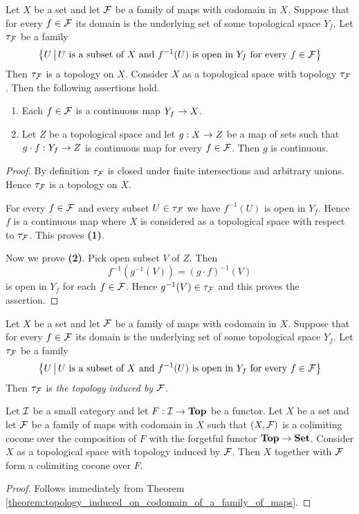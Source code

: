 \begin{theorem}\label{theorem:topology_induced_on_codomain_of_a_family_of_maps}
	Let $X$ be a set and let ${\mathcal F}$ be a family of maps with codomain in $X$. Suppose that for every $f \in {\mathcal F}$ its domain is the underlying set of some topological space $Y_f$. Let $\tau_{{\mathcal F}}$ be a family
	$$\big\{U\,\big|\,U\mbox{ is a subset of }X\mbox{ and }f^{-1}(U)\mbox{ is open in }Y_f\mbox{ for every }f\in {\mathcal F}\big\}$$
	Then $\tau_{{\mathcal F}}$ is a topology on $X$. Consider $X$ as a topological space with topology $\tau_{{\mathcal F}}$. Then the following assertions hold.
	\begin{enumerate}[label=\emph{\textbf{(\arabic*)}}, leftmargin=3.0em]
		\item Each $f \in {\mathcal F}$ is a continuous map $Y_f \rightarrow X$.
		\item Let $Z$ be a topological space and let $g:X\rightarrow Z$ be a map of sets such that $g\cdot f:Y_f\rightarrow Z$ is continuous map for every $f \in {\mathcal F}$. Then $g$ is continuous.
	\end{enumerate}
\end{theorem}
\begin{proof}
	By definition $\tau_{{\mathcal F}}$ is closed under finite intersections and arbitrary unions. Hence $\tau_{{\mathcal F}}$ is a topology on $X$.

	For every $f \in {\mathcal F}$ and every subset $U \in \tau_{{\mathcal F}}$ we have $f^{-1}(U)$ is open in $Y_f$. Hence $f$ is a continuous map where $X$ is considered as a topological space with respect to $\tau_{{\mathcal F}}$. This proves \textbf{(1)}.

	Now we prove \textbf{(2)}. Pick open subset $V$ of $Z$. Then
	$$f^{-1}\left(g^{-1}(V)\right) = \left(g\cdot f\right)^{-1}(V)$$
	is open in $Y_f$ for each $f \in {\mathcal F}$. Hence $g^{-1}(V) \in \tau_{{\mathcal F}}$ and this proves the assertion.
\end{proof}

\begin{definition}
	Let $X$ be a set and let ${\mathcal F}$ be a family of maps with codomain in $X$. Suppose that for every $f \in {\mathcal F}$ its domain is the underlying set of some topological space $Y_f$. Let $\tau_{{\mathcal F}}$ be a family
	$$\big\{U\,\big|\,U\mbox{ is a subset of }X\mbox{ and }f^{-1}(U)\mbox{ is open in }Y_f\mbox{ for every }f\in {\mathcal F}\big\}$$
	Then $\tau_{{\mathcal F}}$ is \textit{the topology induced by ${\mathcal F}$}.
\end{definition}

\begin{corollary}\label{corollary:colimits_in_category_of_topological_spaces}
	Let ${\mathcal I}$ be a small category and let $F:{\mathcal I} \rightarrow \mathbf{Top}$ be a functor. Let $X$ be a set and let ${\mathcal F}$ be a family of maps with codomain in $X$ such that $(X,{\mathcal F})$ is a colimiting cocone over the composition of $F$ with the forgetful functor $\mathbf{Top} \rightarrow \mathbf{Set}$. Consider $X$ as a topological space with topology induced by ${\mathcal F}$. Then $X$ together with ${\mathcal F}$ form a colimiting cocone over $F$.
\end{corollary}
\begin{proof}
	Follows immediately from Theorem \ref{theorem:topology_induced_on_codomain_of_a_family_of_maps}.
\end{proof}

